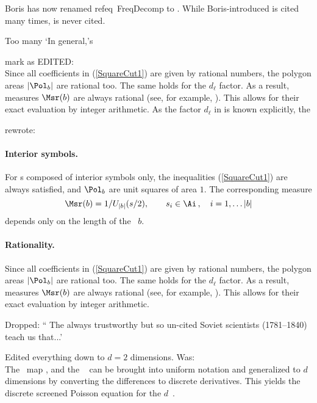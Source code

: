 \begin{description}
      {
Boris has now renamed  refeq~{FreqDecomp} to . While
Boris-introduced  is cited many times, 
is never cited.

Too many `In general,'s

mark as EDITED:\\
Since all coefficients in  (\ref{SquareCut1})  are given by rational numbers,
the polygon areas $|\Pol_{{b}}|$ are rational too. The same holds for the
$d_\ell$ factor. As a result,   measures  $\Msr({{b}})$ are always rational
(see, for example, ). This allows for their exact
evaluation by integer arithmetic.  As the factor $d_\ell$ in  is known explicitly, the
    }

      {rewrote:
\paragraph{Interior symbols.}
For \brick s composed of interior symbols only, the inequalities
(\ref{SquareCut1})  are always satisfied, and  $\Pol_{{b}}$ are unit
squares of area $1$. The corresponding measure
\[
\Msr({b})
= {1}/{U_{|{b}|}({s}/{2})}, \qquad  \Ssym{i}\in \Ai
\,, \quad  i=1,\dots |{b}|
\]
depends  only  on the length of the \brick\ ${b}$.

\paragraph{Rationality.}
Since all coefficients in  (\ref{SquareCut1})  are given by rational numbers,
the polygon areas $|\Pol_{{b}}|$ are rational too. The same holds for the
$d_\ell$ factor. As a result,   measures  $\Msr({{b}})$ are always rational
(see, for example, ). This allows for their exact
evaluation by integer arithmetic.
    }

      {
Dropped: `` The always trustworthy but so un-cited Soviet scientists
(1781–1840) teach us that...'
    }

      {
Edited everything down to $d=2$ dimensions. Was:\\
The \templatt\ map , and the \catlatt\
 can be brought into uniform notation  and
generalized  to $d$ dimensions by converting the {\spt} differences to
discrete derivatives. This yields the discrete screened Poisson
equation for the $d$\dmn\ {\em \catlatt}.

}
\end{description}
